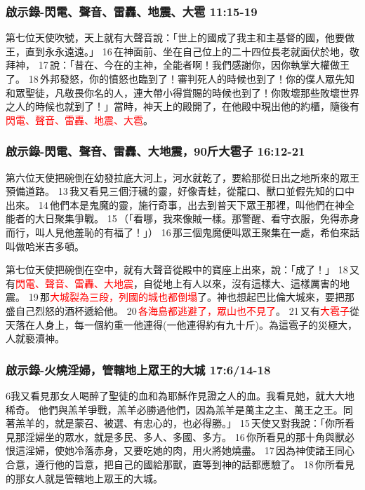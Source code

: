 \subsubsection{啟示錄-閃電、聲音、雷轟、地震、大雹 11:15-19}
第七位天使吹號，天上就有大聲音說：「世上的國成了我主和主基督的國，他要做王，直到永永遠遠。」 16 在神面前、坐在自己位上的二十四位長老就面伏於地，敬拜神， 17 說：「昔在、今在的主神，全能者啊！我們感謝你，因你執掌大權做王了。 18 外邦發怒，你的憤怒也臨到了！審判死人的時候也到了！你的僕人眾先知和眾聖徒，凡敬畏你名的人，連大帶小得賞賜的時候也到了！你敗壞那些敗壞世界之人的時候也就到了！」當時，神天上的殿開了，在他殿中現出他的約櫃，隨後有\textcolor{red}{閃電、聲音、雷轟、地震、大雹}。


\subsubsection{啟示錄-閃電、聲音、雷轟、大地震，90斤大雹子 16:12-21}
第六位天使把碗倒在幼發拉底大河上，河水就乾了，要給那從日出之地所來的眾王預備道路。 13 我又看見三個汙穢的靈，好像青蛙，從龍口、獸口並假先知的口中出來。 14 他們本是鬼魔的靈，施行奇事，出去到普天下眾王那裡，叫他們在神全能者的大日聚集爭戰。 15 （「看哪，我來像賊一樣。那警醒、看守衣服，免得赤身而行，叫人見他羞恥的有福了！」） 16 那三個鬼魔便叫眾王聚集在一處，希伯來話叫做哈米吉多頓。

第七位天使把碗倒在空中，就有大聲音從殿中的寶座上出來，說：「成了！」 18 又有\textcolor{red}{閃電、聲音、雷轟、大地震}，自從地上有人以來，沒有這樣大、這樣厲害的地震。 19 那\textcolor{red}{大城裂為三段，列國的城也都倒塌}了。神也想起巴比倫大城來，要把那盛自己烈怒的酒杯遞給他。 20 \textcolor{red}{各海島都逃避了，眾山也不見了}。 21 又有\textcolor{red}{大雹子}從天落在人身上，每一個約重一他連得(一他連得約有九十斤)。為這雹子的災極大，人就褻瀆神。

\subsubsection{啟示錄-火燒淫婦，管轄地上眾王的大城 17:6/14-18}
6我又看見那女人喝醉了聖徒的血和為耶穌作見證之人的血。我看見她，就大大地稀奇。
他們與羔羊爭戰，羔羊必勝過他們，因為羔羊是萬主之主、萬王之王。同著羔羊的，就是蒙召、被選、有忠心的，也必得勝。」 15 天使又對我說：「你所看見那淫婦坐的眾水，就是多民、多人、多國、多方。 16 你所看見的那十角與獸必恨這淫婦，使她冷落赤身，又要吃她的肉，用火將她燒盡。 17 因為神使諸王同心合意，遵行他的旨意，把自己的國給那獸，直等到神的話都應驗了。 18 你所看見的那女人就是管轄地上眾王的大城。


